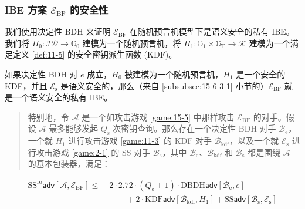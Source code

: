 \subsubsection{IBE 方案 $\mathcal{E}_\mathrm{BF}$ 的安全性}\label{subsubsec:15-6-3-3}

我们使用决定性 BDH 来证明 $\mathcal{E}_\mathrm{BF}$ 在随机预言机模型下是语义安全的私有 IBE。我们将 $H_0:\mathcal{ID}\to\mathbb{G}_0$ 建模为一个随机预言机，将 $H_1:\mathbb{G}_1\times\mathbb{G}_\mathrm{T}\to\mathcal{K}$ 建模为一个满足定义 \ref{def:11-5} 的安全密钥派生函数 (KDF)。

\begin{theorem}\label{theo:15-6}
如果决定性 BDH 对 $e$ 成立，$H_0$ 被建模为一个随机预言机，$H_1$ 是一个安全的 KDF，并且 $\mathcal{E}_\mathrm{s}$ 是语义安全的，那么（来自 \ref{subsubsec:15-6-3-1} 小节的）$\mathcal{E}_\mathrm{BF}$ 就是一个语义安全的私有 IBE。
\begin{quote}
特别地，令 $\mathcal{A}$ 是一个如攻击游戏 \ref{game:15-5} 中那样攻击 $\mathcal{E}_\mathrm{BF}$ 的对手。假设 $\mathcal{A}$ 最多能够发起 $Q_\mathrm{s}$ 次密钥查询。那么存在一个决定性 BDH 对手 $\mathcal{B}_\mathrm{e}$，一个就 $H_1$ 进行攻击游戏 \ref{game:11-3} 的 KDF 对手 $\mathcal{B}_\mathrm{kdf}$，以及一个就 $\mathcal{E}_\mathrm{s}$ 进行攻击游戏 \ref{game:2-1} 的 SS 对手 $\mathcal{B}_\mathrm{s}$，其中 $\mathcal{B}_\mathrm{e}$、$\mathcal{B}_\mathrm{kdf}$ 和 $\mathcal{B}_\mathrm{s}$ 都是围绕 $\mathcal{A}$ 的基本包装器，满足：
\end{quote}
\begin{equation}\label{eq:15-26}
\begin{aligned}
\mathrm{SS}^\mathrm{ro}\mathsf{adv}[\mathcal{A},\mathcal{E}_\mathrm{BF}]
\leq\;
& 2\cdot2.72\cdot(Q_\mathrm{s}+1)\cdot
\mathrm{DBDH}\mathsf{adv}[\mathcal{B}_\mathrm{e},e]\\
&\qquad +2\cdot
\mathrm{KDF}\mathsf{adv}[\mathcal{B}_\mathrm{kdf},H_1]
+
\mathrm{SS}\mathsf{adv}[\mathcal{B}_\mathrm{s},\mathcal{E}_\mathrm{s}]
\end{aligned}
\end{equation}
\end{theorem}

